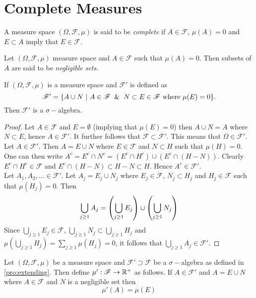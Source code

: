 \section{Complete Measures}
\begin{definition}
  A measure space $(\Omega, \mathscr{F}, \mu)$ is said to be \textit{complete} if $A\in \mathscr{F}$, $\mu(A) = 0$ and $E\subset A$ imply that $E\in \mathscr{F}$.
\end{definition}
\begin{definition} 
  Let $(\Omega, \mathscr{F}, \mu)$ measure space and $A\in \mathscr{F}$ such that $\mu(A) = 0$. Then subsets of $A$ are said to be \textit{negligible sets}.
\end{definition}
\begin{proposition}\label{pro:extending}
  If $(\Omega, \mathscr{F}, \mu)$ is a measure space and $\mathscr{F}'$ is defined as
  \[\mathscr{F}' = \{A\cup N\ |\ A\in \mathscr{F} \And N\subset E \in \mathscr{F}\ \text{where}\ \mu(E) = 0\}.\]
  Then $ \mathscr{F}'$ is a $\sigma-$algebra.
\end{proposition}
\begin{proof}
  Let $A\in \mathscr{F}$ and $E = \emptyset$ (implying that $\mu(E) = 0$) then $A\cup N = A$ where $N\subset E$, hence $A\in \mathscr{F}'$. It further follows that $ \mathscr{F} \subset \mathscr{F}'$. This means that $\Omega\in \mathscr{F}'$.\\

  Let $A \in \mathscr{F}'$. Then $A = E\cup N$ where $E \in \mathscr{F}$ and $N \subset H$ such that $\mu(H) = 0$. One can then write $A^c = E^c \cap N^c = (E^c \cap H^c) \cup (E^c \cap (H-N))$. Clearly $E^c\cap H^c \in \mathscr{F}$ and $E^c\cap (H-N) \subset H-N \subset H$. Hence $A^c \in \mathscr{F}'$.\\

  Let $A_1,A_2,... \in \mathscr{F}'$. Let $A_j = E_j \cup N_j$ where $E_j\in \mathscr{F}$, $N_j \subset H_j$ and $H_j \in \mathscr{F}$ such that $\mu(H_j) = 0$. Then
  \begin{align*}
    \bigcup_{j\geq 1} A_j= \left(\bigcup_{j\geq 1} E_j \right) \cup \left( \bigcup_{j\geq 1} N_j \right)
  \end{align*}
  Since $\bigcup_{j\geq1} E_j \in \mathscr{F}$, $ \bigcup_{j\geq1} N_j \subset \bigcup_{j\geq 1} H_j$ and $\mu(\bigcup_{j\geq1} H_j) = \sum_{j\geq1} \mu(H_j) = 0$, it follows that $\bigcup_{j\geq1} A_j \in \mathscr{F}'$. 
\end{proof}
\begin{definition}
  Let $(\Omega, \mathscr{F}, \mu)$ be a measure space and $ \mathscr{F}' \supset \mathscr{F}$ be a $\sigma-$algebra as defined in \cref{pro:extending}. Then define $\mu': \mathscr{F} \to \mathbb{R}^+$ as follows. If $A\in \mathscr{F}'$ and $A = E \cup N$ where $A\in \mathscr{F}$ and $N$ is a negligible set then
  \[\mu'(A) = \mu(E)\]
\end{definition}
